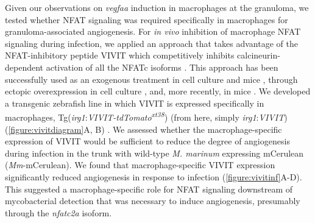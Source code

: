 Given our observations on \textit{vegfaa} induction in macrophages at the granuloma, we tested whether NFAT signaling was required specifically in macrophages for granuloma\hyp{}associated angiogenesis. For \textit{in vivo} inhibition of macrophage NFAT signaling during infection, we applied an approach that takes advantage of the NFAT\hyp{}inhibitory peptide VIVIT which competitively inhibits calcineurin\hyp{}dependent activation of all the NFATc isoforms \citep{Aramburu1999}. This approach has been successfully used as an exogenous treatment in cell culture \citep{Deerhake2021} and mice \citep{Noguchi2004, Elloumi2012, Rojanathammanee2015}, through ectopic overexpression in cell culture \citep{McCullagh2004},  and, more recently, in mice \citep{Poli2022, Peuker2022}. We developed a transgenic zebrafish line in which VIVIT is expressed specifically in macrophages, Tg(\textit{irg1}:\textit{VIVIT\hyp{}tdTomato\textsuperscript{xt38}}) (from here, simply \textit{irg1}:\textit{VIVIT}) (\autoref{figure:vivitdiagram}A, B) \citep{Sanderson2015}. We assessed whether the macrophage\hyp{}specific expression of VIVIT would be sufficient to reduce the degree of angiogenesis during infection in the trunk with wild\hyp{}type \textit{M. marinum} expressing mCerulean (\textit{Mm}\hyp{}mCerulean). We found that macrophage\hyp{}specific VIVIT expression significantly reduced angiogenesis in response to infection (\autoref{figure:vivitinf}A\hyp{}D). This suggested a macrophage\hyp{}specific role for NFAT signaling downstream of mycobacterial detection that was necessary to induce angiogenesis, presumably through the \textit{nfatc2a} isoform.


